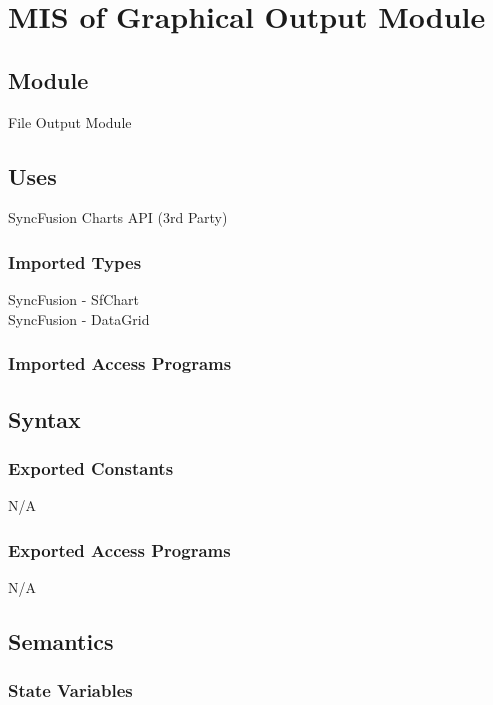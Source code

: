 \documentclass[12pt, titlepage]{article}
\begin{document}
\newpage

\section{MIS of Graphical Output Module} \label{GO} 

\subsection{Module}

File Output Module

\subsection{Uses}
SyncFusion Charts API (3rd Party)

\subsubsection{Imported Types}
SyncFusion - SfChart \\
SyncFusion - DataGrid

\subsubsection{Imported Access Programs}

\subsection{Syntax}

\subsubsection{Exported Constants}

N/A

\subsubsection{Exported Access Programs}
N/A

\subsection{Semantics}

\subsubsection{State Variables}
\end{document}

